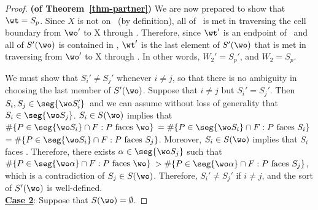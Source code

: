 \begin{proof}{\bf (of Theorem~\ref{thm-partner})  }
We are now prepared to show that $\wt = S_{p}$.
Since $X$ is not on \wwh\ (by definition),
all of \wwh\ is met in traversing the cell boundary from $\wo '$ to X through
\wwh.
Therefore, 
since $\wt '$ is an endpoint of \wwh\ and all of $S'(\wo)$ is contained
in \wwh, $\wt '$ is the last element
of $S'(\wo)$ that is met in traversing from $\wo '$ to X through \wwh.
In other words, $W_{2}' = S_{p}'$, and $W_{2} = S_{p}$.

We must show that $S_{i}' \neq S_{j}'$ whenever $i \neq j$,
so that there is no ambiguity in choosing the last member of $S'(\wo)$.
Suppose that $i \neq j$ but $S_{i}' = S_{j}'$.
Then $S_{i},S_{j} \in \seg{\wo S_{i}'}$\ and we can assume without loss of
generality that $S_{i} \in \seg{\wo S_{j}}$.
\mbox{$S_{i} \in S(\wo)$} implies that \mbox{$\#\{P \in \seg{\wo S_{i}} \cap F : P 
\mbox{ faces \wo} \}$} 
\mbox{$= \#\{P \in \seg{\wo S_{i}} \cap F : P \mbox{ faces } S_{i}\}$}
\mbox{$=\#\{P \in \seg{\wo S_{i}} \cap F : P \mbox{ faces } S_{j}\}$}.
Moreover, \mbox{$S_{i} \in S(\wo)$} implies that $S_{i}$ faces \wo.
Therefore, there exists \mbox{$\alpha \in \seg{\wo S_{j}}$} such that
\mbox{$\#\{P \in \seg{\wo\alpha} \cap F : P \mbox{ faces \wo} \} $} 
\mbox{$> \#\{P \in \seg{\wo\alpha} \cap F : P \mbox{ faces } S_{j} \}$},
which is a contradiction of $S_{j} \in S(\wo)$.
Therefore, $S_{i}' \neq S_{j}'$ if $i \neq j$, and
the sort of $S'(\wo)$ is well-defined.\\
%
\underline{{\bf Case 2}}: Suppose that $S(\wo) = \emptyset$.
%

\end{proof}
